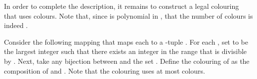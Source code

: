 \documentclass[11pt]{article}
\begin{document}
\begin{center}
\end{center}

In order to complete the description, it remains to construct a legal colouring 
that uses  colours. Note that, since  is polynomial in , that the number of colours is indeed .

Consider the following mapping  that maps each  to a -tuple . For each , set  to be the largest integer  such that there exists an integer in the range  that is divisible by . Next, take any bijection  between  and  the set . 
Define the colouring  of   as the composition of   and . Note that the colouring  uses at most  colours. 
\end{document}
